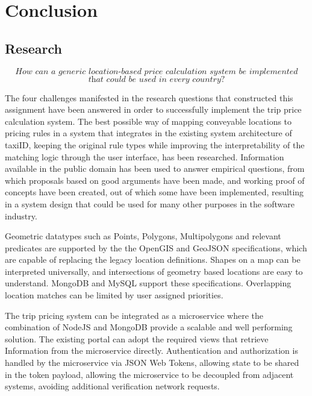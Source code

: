 \graphicspath{{Chapter7/Figs/Vector/}{Chapter7/Figs/}}

%
\chapter{Conclusion}
\section{Research}
\[\textit{How can a generic location-based price calculation system be implemented}\]
\[\textit{that could be used in every country?}\] \hfill

The four challenges manifested in the research questions that constructed this assignment have been answered in order to successfully implement the trip price calculation system. The best possible way of mapping conveyable locations to pricing rules in a system that integrates in the existing system architecture of taxiID, keeping the original rule types while improving the interpretability of the matching logic through the user interface, has been researched. Information available in the public domain has been used to answer empirical questions, from which proposals based on good arguments have been made, and working proof of concepts have been created, out of which some have been implemented, resulting in a system design that could be used for many other purposes in the software industry.

Geometric datatypes such as Points, Polygons, Multipolygons and relevant predicates are supported by the the OpenGIS and GeoJSON specifications, which are capable of replacing the legacy location definitions. Shapes on a map can be interpreted universally, and intersections of geometry based locations are easy to understand. MongoDB and MySQL support these specifications. Overlapping location matches can be limited by user assigned priorities.

The trip pricing system can be integrated as a microservice where the combination of NodeJS and MongoDB provide a scalable and well performing solution. The existing portal can adopt the required views that retrieve Information from the microservice directly. Authentication and authorization is handled by the microservice via JSON Web Tokens, allowing state to be shared in the token payload, allowing the microservice to be decoupled from adjacent systems, avoiding additional verification network requests.

